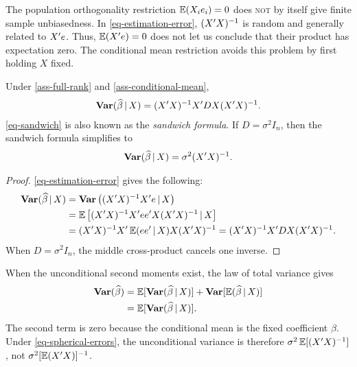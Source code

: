 \documentclass[a4paper,12pt]{article}
\begin{document}
\begin{remark}[Orthogonality]
	The population orthogonality restriction $\operatorname{\mathbb{E}}(X_i e_i)=0$ does \textsc{not} by itself give finite sample unbiasedness.
	In \eqref{eq-estimation-error},
	$(X^{\prime} X)^{-1}$ is random and generally related to $X^{\prime} e$.
	Thus, $\operatorname{\mathbb{E}}(X^{\prime} e)=0$ does not let us conclude that their product has expectation zero.
	The conditional mean restriction avoids this problem by first holding $X$ fixed.
\end{remark}

\begin{proposition}\label{prop-variance}
	Under \autoref{ass-full-rank} and \ref{ass-conditional-mean},
	\begin{align}\label{eq-sandwich}
		\operatorname{\text{\textrm{\upshape\textbf{Var}}}}(\widehat\beta\mathpunct{}|\mathpunct{} X)
		=(X^{\prime} X)^{-1} X^{\prime} D X(X^{\prime} X)^{-1}.
	\end{align}
	\autoref{eq-sandwich} is also known as the \emph{sandwich formula}.
	If $D=\sigma^2 I_n$, then the sandwich formula simplifies to
	\begin{align}\label{eq-homoskedastic-variance}
		\operatorname{\text{\textrm{\upshape\textbf{Var}}}}(\widehat\beta\mathpunct{}|\mathpunct{} X)=\sigma^2(X^{\prime} X)^{-1}.
	\end{align}
\end{proposition}
\begin{proof}
	\autoref{eq-estimation-error} gives the following:
	\begin{align}
		\operatorname{\text{\textrm{\upshape\textbf{Var}}}}(\widehat\beta\mathpunct{}|\mathpunct{} X)
		&= \operatorname{\text{\textrm{\upshape\textbf{Var}}}}\big((X^{\prime} X)^{-1} X^{\prime} e\mathpunct{}|\mathpunct{} X\big)\\
		&= \operatorname{\mathbb{E}}\big[(X^{\prime} X)^{-1} X^{\prime} e e^{\prime} X(X^{\prime} X)^{-1}\mathpunct{}|\mathpunct{} X\big]\\
		&= (X^{\prime} X)^{-1} X^{\prime} \operatorname{\mathbb{E}}(ee^{\prime}\mathpunct{}|\mathpunct{} X) X(X^{\prime} X)^{-1}
		= (X^{\prime} X)^{-1} X^{\prime} D X(X^{\prime} X)^{-1}.
	\end{align}
	When $D=\sigma^2 I_n$, the middle cross-product cancels one inverse.
\end{proof}

\begin{remark}
	When the unconditional second moments exist, the law of total variance gives
	\begin{align*}
		\operatorname{\text{\textrm{\upshape\textbf{Var}}}}(\widehat\beta)
		&=\operatorname{\mathbb{E}}[\operatorname{\text{\textrm{\upshape\textbf{Var}}}}(\widehat\beta\mathpunct{}|\mathpunct{} X)]
		+\operatorname{\text{\textrm{\upshape\textbf{Var}}}}[\operatorname{\mathbb{E}}(\widehat\beta\mathpunct{}|\mathpunct{} X)]\\
		&=\operatorname{\mathbb{E}}[\operatorname{\text{\textrm{\upshape\textbf{Var}}}}(\widehat\beta\mathpunct{}|\mathpunct{} X)].
	\end{align*}
	The second term is zero because the conditional mean is the fixed coefficient $\beta$.
	Under \eqref{eq-spherical-errors}, the unconditional variance is therefore $\sigma^2\operatorname{\mathbb{E}}[(X^{\prime} X)^{-1}]$,
	not $\sigma^2[\operatorname{\mathbb{E}}(X^{\prime} X)]^{-1}$.
\end{remark}
\end{document}
